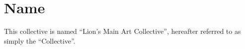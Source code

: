 \chapter{Name}\label{sec:name}
This collective is named ``Lion's Main Art Collective'', hereafter referred to as simply the ``Collective''.
